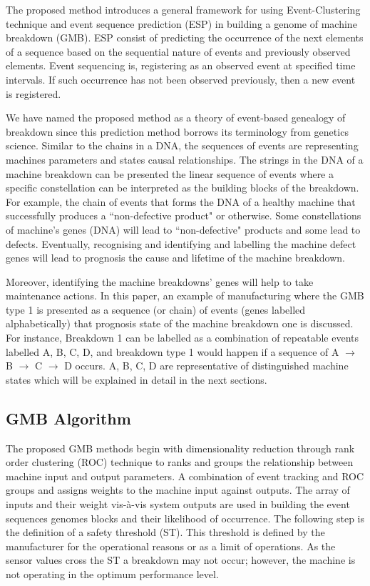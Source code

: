\documentclass[conference]{IEEEtran}
\begin{document}
The proposed method introduces a general framework for using Event-Clustering technique \cite{Danishvar2018} and event sequence prediction (ESP) in building a genome of machine breakdown (GMB). ESP consist of predicting the occurrence of the next elements of a sequence based on the sequential nature of events and previously observed elements. Event sequencing is, registering as an observed event at specified time intervals. If such occurrence has not been observed previously, then a new event is registered. 

We have named the proposed method as a theory of event-based genealogy of breakdown since this prediction method borrows its terminology from genetics science. Similar to the chains in a DNA, the sequences of events are representing machines parameters and states causal relationships. The strings in the DNA of a machine breakdown can be presented the linear sequence of events where a specific constellation can be interpreted as the building blocks of the breakdown. For example, the chain of events that forms the DNA of a healthy machine that successfully produces a ``non-defective product" or otherwise. Some constellations of machine’s genes (DNA) will lead to ``non-defective" products and some lead to defects. Eventually, recognising and identifying and labelling the machine defect genes will lead to prognosis the cause and lifetime of the machine breakdown.

Moreover, identifying the machine breakdowns’ genes will help to take maintenance actions. In this paper, an example of manufacturing where the GMB type 1 is presented as a sequence (or chain) of events (genes labelled alphabetically) that prognosis state of the machine breakdown one is discussed. For instance, Breakdown 1 can be labelled as a combination of repeatable events labelled A, B, C, D, and breakdown type 1 would happen if a sequence of A $\to$ B $\to$ C $\to$ D occurs. A, B, C, D are representative of distinguished machine states which will be explained in detail in the next sections.

\subsection{GMB Algorithm}
\label{subsec:GMB_Algorithm}
The proposed GMB methods begin with dimensionality reduction through rank order clustering (ROC) technique to ranks and groups the relationship between machine input and output parameters. A combination of event tracking \cite{Tavakoli2013} and ROC \cite{Danishvar2018} groups and assigns weights to the machine input against outputs. The array of inputs and their weight vis-à-vis system outputs are used in building the event sequences genomes blocks and their likelihood of occurrence. The following step is the definition of a safety threshold (ST). This threshold is defined by the manufacturer for the operational reasons or as a limit of operations. As the sensor values cross the ST a breakdown may not occur; however, the machine is not operating in the optimum performance level.
\end{document}
